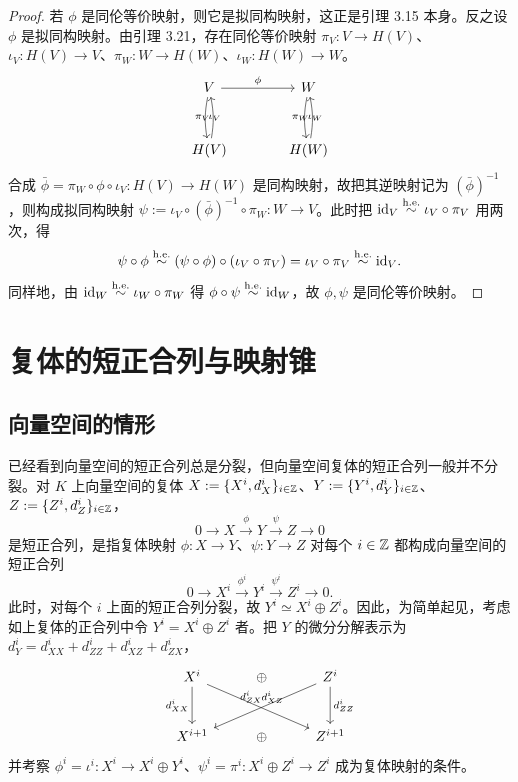 \begin{proof}
若 $\phi$ 是同伦等价映射，则它是拟同构映射，这正是引理 3.15 本身。反之设 $\phi$ 是拟同构映射。由引理 3.21，存在同伦等价映射 $\pi_V\colon V\to H(V)$、$\iota_V\colon H(V)\to V$、$\pi_W\colon W\to H(W)$、$\iota_W\colon H(W)\to W$。
\[
\begin{tikzcd}[row sep=3.0em, column sep=3.6em]
V \arrow[r,"\phi"] \arrow[d,bend right=10,"\iota_V"] & W \arrow[d,bend right=10,"\iota_W"] \\
H(V) \arrow[u,bend right=10,"\pi_V"] & H(W) \arrow[u,bend right=10,"\pi_W"]
\end{tikzcd}
\]
合成 $\bar\phi=\pi_W\circ\phi\circ\iota_V\colon H(V)\to H(W)$ 是同构映射，故把其逆映射记为 $(\bar\phi)^{-1}$，则构成拟同构映射 $\psi:=\iota_V\circ(\bar\phi)^{-1}\circ\pi_W\colon W\to V$。此时把 $\mathrm{id}_V\overset{\mathrm{h.e.}}{\sim}\iota_V\circ\pi_V$ 用两次，得
\[
\psi\circ\phi\overset{\mathrm{h.e.}}{\sim}(\psi\circ\phi)\circ(\iota_V\circ\pi_V)=\iota_V\circ\pi_V\overset{\mathrm{h.e.}}{\sim}\mathrm{id}_V.
\]
同样地，由 $\mathrm{id}_W\overset{\mathrm{h.e.}}{\sim}\iota_W\circ\pi_W$ 得 $\phi\circ\psi\overset{\mathrm{h.e.}}{\sim}\mathrm{id}_W$，故 $\phi,\psi$ 是同伦等价映射。
\end{proof}


\section{复体的短正合列与映射锥}

\subsection{向量空间的情形}

已经看到向量空间的短正合列总是分裂，但向量空间复体的短正合列一般并不分裂。对 $K$ 上向量空间的复体 $X:=\{X^i,d_X^i\}_{i\in\mathbb{Z}}$、$Y:=\{Y^i,d_Y^i\}_{i\in\mathbb{Z}}$、$Z:=\{Z^i,d_Z^i\}_{i\in\mathbb{Z}}$，
\[
0\to X\xrightarrow{\phi}Y\xrightarrow{\psi}Z\to 0
\]
是短正合列，是指复体映射 $\phi\colon X\to Y$、$\psi\colon Y\to Z$ 对每个 $i\in\mathbb{Z}$ 都构成向量空间的短正合列
\[
0\to X^i\xrightarrow{\phi^i}Y^i\xrightarrow{\psi^i}Z^i\to 0.
\]
此时，对每个 $i$ 上面的短正合列分裂，故 $Y^i\simeq X^i\oplus Z^i$。因此，为简单起见，考虑如上复体的正合列中令 $Y^i=X^i\oplus Z^i$ 者。把 $Y$ 的微分分解表示为 $d_Y^i=d_{XX}^i+d_{ZZ}^i+d_{XZ}^i+d_{ZX}^i$，
\[
\begin{tikzcd}[row sep=2.6em, column sep=2.6em]
X^i \arrow[d,"d_{XX}^i"'] \arrow[drr,"d_{XZ}^i"] & \oplus & Z^i \arrow[d,"d_{ZZ}^i"] \arrow[dll,"d_{ZX}^i"'] \\
X^{i+1} & \oplus & Z^{i+1}
\end{tikzcd}
\]
并考察 $\phi^i=\iota^i\colon X^i\to X^i\oplus Y^i$、$\psi^i=\pi^i\colon X^i\oplus Z^i\to Z^i$ 成为复体映射的条件。

